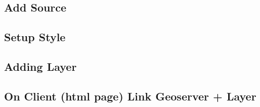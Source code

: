 \subsection{Add Source}


\subsection{Setup Style}


\subsection{Adding Layer}


\subsection{On Client (html page) Link Geoserver + Layer}
